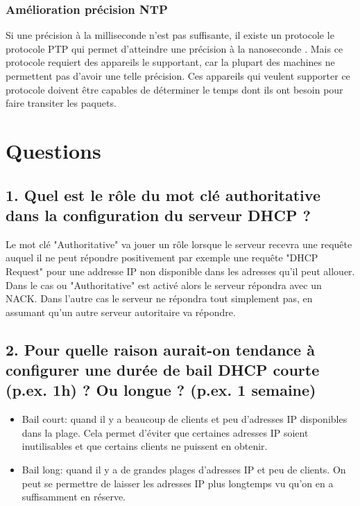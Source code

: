 \documentclass{article}
\begin{document}
\subsubsection{Amélioration précision NTP} 
Si une précision à la milliseconde n'est pas suffisante, il existe un protocole le protocole PTP qui permet d'atteindre une précision à la nanoseconde \cite{PTP}. Mais ce protocole requiert des appareils le supportant, car la plupart des machines ne permettent pas d'avoir une telle précision. Ces appareils qui veulent supporter ce protocole doivent être capables de déterminer le temps dont ils ont besoin pour faire transiter les paquets.

\clearpage

\section{Questions}

\subsection*{1. Quel est le rôle du mot clé authoritative dans la configuration du serveur DHCP ?}
Le mot clé "Authoritative" va jouer un rôle lorsque le serveur recevra une requête auquel il ne peut répondre positivement par exemple une requête "DHCP Request" pour une addresse IP non disponible dans les adresses qu'il peut allouer. Dans le cas ou "Authoritative" est activé alors le serveur répondra avec un NACK. Dans l'autre cas le serveur ne répondra tout simplement pas, en assumant qu'un autre serveur autoritaire va répondre.\cite{authoritative}\\

\subsection*{2. Pour quelle raison aurait-on tendance à configurer une durée de bail DHCP courte (p.ex. 1h) ? Ou longue ? (p.ex. 1 semaine)}
\begin{itemize}
\item Bail court: quand il y a beaucoup de clients et peu d'adresses IP disponibles dans la plage. Cela permet d'éviter que certaines adresses IP soient inutilisables et que certains clients ne puissent en obtenir.
\item Bail long: quand il y a de grandes plages d'adresses IP et peu de clients. On peut se permettre de laisser les adresses IP plus longtemps vu qu'on en a suffisamment en réserve.
\end{itemize}
\end{document}
